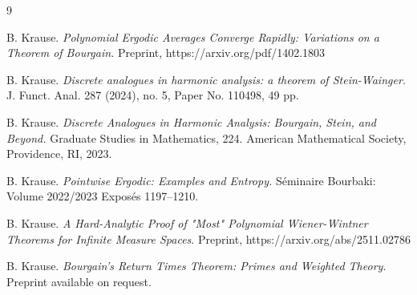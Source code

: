 \documentclass[12pt]{amsart}
\numberwithin{equation}{section}
\theoremstyle{definition}
\begin{document}
\begin{thebibliography}{9}



B. Krause.
\emph{Polynomial Ergodic Averages Converge Rapidly: Variations on a Theorem of Bourgain.}
Preprint, https://arxiv.org/pdf/1402.1803

B. Krause.
\emph{Discrete analogues in harmonic analysis: a theorem of Stein-Wainger.}
J. Funct. Anal. 287 (2024), no. 5, Paper No. 110498, 49 pp.

B. Krause. \emph{Discrete Analogues in Harmonic Analysis: Bourgain, Stein, and Beyond.}
Graduate Studies in Mathematics, 224. American Mathematical Society, Providence, RI, 2023.

B. Krause. \emph{Pointwise Ergodic: Examples and Entropy.} S\'{e}minaire Bourbaki: Volume 2022/2023 Expos\'{e}s 1197–1210.



B. Krause. \emph{A Hard-Analytic Proof of "Most" Polynomial Wiener-Wintner Theorems for Infinite Measure Spaces}.
Preprint, https://arxiv.org/abs/2511.02786


B. Krause.
\emph{Bourgain's Return Times Theorem: Primes and Weighted Theory}.
Preprint available on request.




\end{thebibliography}
\end{document}
